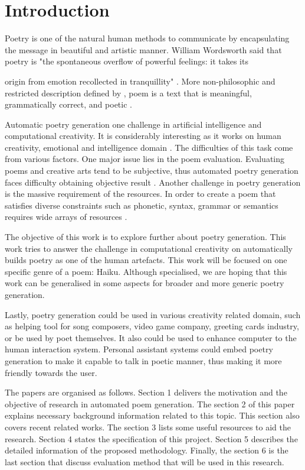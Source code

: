 \section{Introduction}



Poetry is one of the natural human methods to communicate by encapsulating the message in beautiful and artistic manner. William Wordsworth said that poetry is "the spontaneous overflow of powerful feelings: it takes its

origin from emotion recollected in tranquillity" \cite{wordsworth1990preface}. More non-philosophic and restricted description defined by \citeauthor{manurung2004evolutionary}, poem is a text that is meaningful, grammatically correct, and poetic \cite{manurung2004evolutionary}.


Automatic poetry generation one challenge in artificial intelligence and computational creativity. It is considerably interesting as it works on human creativity, emotional and intelligence domain \cite{colton2012computational}. The difficulties of this task come from various factors. One major issue lies in the poem evaluation. Evaluating poems and creative arts tend to be subjective, thus automated poetry generation faces difficulty obtaining objective result \cite{binsted1996machine}. Another challenge in poetry generation is the massive requirement of the resources. In order to create a poem that satisfies diverse constraints such as phonetic, syntax, grammar or semantics requires wide arrays of resources \cite{manurung2000towards}. 


The objective of this work is to explore further about poetry generation. This work tries to answer the challenge in computational creativity on automatically builds poetry as one of the human artefacts. This work will be focused on one specific genre of a poem: Haiku. Although specialised, we are hoping that this work can be generalised in some aspects for broader and more generic poetry generation. 


Lastly, poetry generation could be used in various creativity related domain, such as helping tool for song composers, video game company, greeting cards industry, or be used by poet themselves. It also could be used to enhance computer to the human interaction system. Personal assistant systems could embed poetry generation to make it capable to talk in poetic manner, thus making it more friendly towards the user. 


The papers are organised as follows. Section 1 delivers the motivation and the objective of research in automated poem generation. The section 2 of this paper explains necessary background information related to this topic. This section also covers recent related works. The section 3 lists some useful resources to aid the research. Section 4 states the specification of this project. Section 5 describes the detailed information of the proposed methodology. Finally, the section 6 is the last section that discuss evaluation method that will be used in this research.

